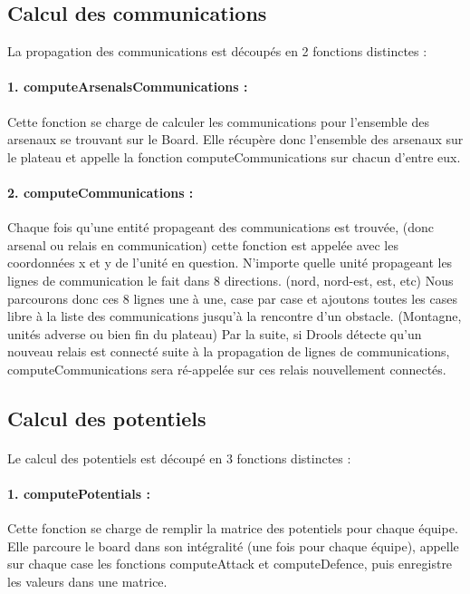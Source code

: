 		\subsection{Calcul des communications}
		
			La propagation des communications est découpés en 2 fonctions distinctes :
			
			\paragraph{1. computeArsenalsCommunications : }
			Cette fonction se charge de calculer les communications pour l'ensemble des arsenaux se trouvant sur le Board.
			Elle récupère donc l'ensemble des arsenaux sur le plateau et appelle la fonction computeCommunications sur chacun d'entre eux.
			
			\paragraph{2. computeCommunications : }
			Chaque fois qu'une entité propageant des communications est trouvée, (donc arsenal ou relais en communication) cette fonction est appelée
			avec les coordonnées x et y de l'unité en question.
			N'importe quelle unité propageant les lignes de communication le fait dans 8 directions. (nord, nord-est, est, etc)
			Nous parcourons donc ces 8 lignes une à une, case par case et ajoutons toutes les cases libre à la liste des communications jusqu'à
			la rencontre d'un obstacle. (Montagne, unités adverse ou bien fin du plateau)
			Par la suite, si Drools détecte qu'un nouveau relais est connecté suite à la propagation de lignes de communications, computeCommunications
			sera ré-appelée sur ces relais nouvellement connectés.
		
		\subsection{Calcul des potentiels}
		
			\paragraph{}
			Le calcul des potentiels est découpé en 3 fonctions distinctes :
			
			\paragraph{1. computePotentials : }
			Cette fonction se charge de remplir la matrice des potentiels pour chaque équipe.
			Elle parcoure le board dans son intégralité (une fois pour chaque équipe), appelle sur chaque case les fonctions computeAttack et 
			computeDefence, puis enregistre les valeurs dans une matrice.
			
